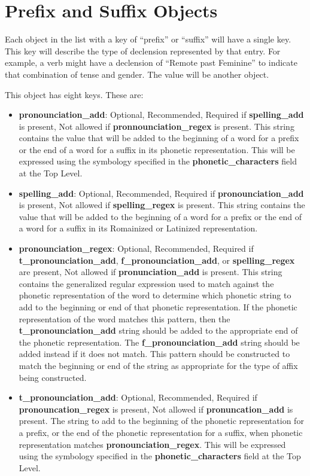 \section{Prefix and Suffix Objects}

Each object in the list with a key of ``prefix'' or ``suffix'' will have a single key.  This key will describe the type of declension represented by that entry.  For example, a verb might have a declension of ``Remote past Feminine'' to indicate that combination of tense and gender.  The value will be another object.

This object has eight keys.  These are:
\begin{itemize}
	\item \textbf{pronounciation\_add}: Optional, Recommended, Required if \textbf{spelling\_add} is present, Not allowed if \textbf{pronnounciation\_regex} is present.  This string contains the value that will be added to the beginning of a word for a prefix or the end of a word for a suffix in its phonetic representation.  This will be expressed using the symbology specified in the \textbf{phonetic\_characters} field at the Top Level.
	\item \textbf{spelling\_add}: Optional, Recommended, Required if \textbf{pronounciation\_add} is present, Not allowed if \textbf{spelling\_regex} is present.  This string contains the value that will be added to the beginning of a word for a prefix or the end of a word for a suffix in its Romainized or Latinized representation.
	\item \textbf{pronounciation\_regex}: Optional, Recommended, Required if \textbf{t\_pronounciation\_add}, \textbf{f\_pronounciation\_add}, or \textbf{spelling\_regex} are present, Not allowed if \textbf{pronunciation\_add} is present.  This string contains the generalized regular expression used to match against the phonetic representation of the word to determine which phonetic string to add to the beginning or end of that phonetic representation.  If the phonetic representation of the word matches this pattern, then the \textbf{t\_pronounciation\_add} string should be added to the appropriate end of the phonetic representation.  The \textbf{f\_pronounciation\_add} string should be added instead if it does not match.  This pattern should be constructed to match the beginning or end of the string as appropriate for the type of affix being constructed.
	\item \textbf{t\_pronounciation\_add}: Optional, Recommended, Required if \textbf{pronouncation\_regex} is present, Not allowed if \textbf{pronuncation\_add} is present.  The string to add to the beginning of the phonetic representation for a prefix, or the end of the phonetic representation for a suffix, when phonetic representation matches \textbf{pronounciation\_regex}.  This will be expressed using the symbology specified in the \textbf{phonetic\_characters} field at the Top Level.

\end{itemize}
